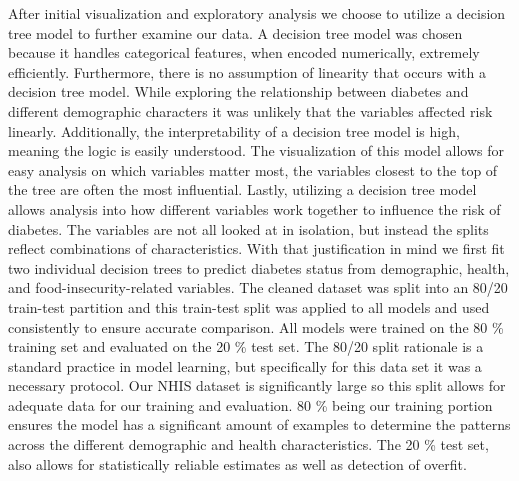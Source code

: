 \documentclass{article}
\theoremstyle{plain}
\theoremstyle{definition}
\theoremstyle{remark}
\begin{document}
After initial visualization and exploratory analysis we choose to utilize a decision tree model to further examine our data. A decision tree model was chosen because it handles categorical features, when encoded numerically, extremely efficiently. Furthermore, there is no assumption of linearity that occurs with a decision tree model. While exploring the relationship between diabetes and different demographic characters it was unlikely that the variables affected risk linearly. Additionally, the interpretability of a decision tree model is high, meaning the logic is easily understood. The visualization of this model allows for easy analysis on which variables matter most, the variables closest to the top of the tree are often the most influential. Lastly, utilizing a decision tree model allows analysis into how different variables work together to influence the risk of diabetes. The variables are not all looked at in isolation, but instead the splits reflect combinations of characteristics. 
With that justification in mind we first fit two individual decision trees to predict diabetes status from demographic, health, and food-insecurity-related variables. The cleaned dataset was split into an 80/20 train-test partition and this train-test split was applied to all models and used consistently to ensure accurate comparison. All models were trained on the 80 \% training set and evaluated on the 20 \% test set. The 80/20 split rationale is a standard practice in model learning, but specifically for this data set it was a necessary protocol. Our NHIS dataset is significantly large so this split allows for adequate data for our training and evaluation. 80 \% being our training portion ensures the model has a significant amount of examples to determine the patterns across the different demographic and health characteristics. The 20 \% test set, also allows for statistically reliable estimates as well as detection of overfit. 
\end{document}
